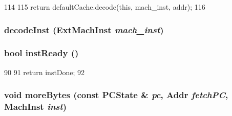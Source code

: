 \begin{DoxyCode}
114     {
115         return defaultCache.decode(this, mach_inst, addr);
116     }
\end{DoxyCode}
\hypertarget{classSparcISA_1_1Decoder_a148768e0e9062eb41f604040d0ea86e6}{
\subsubsection[{decodeInst}]{ decodeInst ({\bf ExtMachInst} {\em mach\_\-inst})}}
\label{classSparcISA_1_1Decoder_a148768e0e9062eb41f604040d0ea86e6}
\hypertarget{classSparcISA_1_1Decoder_a9f6a0bc8946ca58d5d59a5dbc6a3181f}{
\subsubsection[{instReady}]{\setlength{\rightskip}{0pt plus 5cm}bool instReady ()}}
\label{classSparcISA_1_1Decoder_a9f6a0bc8946ca58d5d59a5dbc6a3181f}



\begin{DoxyCode}
90     {
91         return instDone;
92     }
\end{DoxyCode}
\hypertarget{classSparcISA_1_1Decoder_a85a99c8dd9425508bee9a17836dbbd12}{
\subsubsection[{moreBytes}]{\setlength{\rightskip}{0pt plus 5cm}void moreBytes (const {\bf PCState} \& {\em pc}, \/  {\bf Addr} {\em fetchPC}, \/  {\bf MachInst} {\em inst})}}
\label{classSparcISA_1_1Decoder_a85a99c8dd9425508bee9a17836dbbd12}



